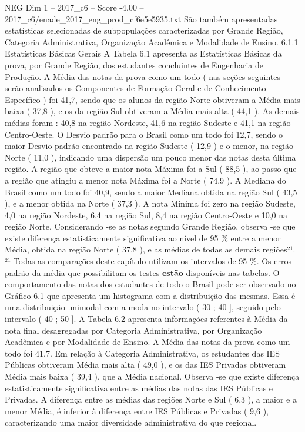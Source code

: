 \begin{textsample}{NEG Dim 1 – 2017\_c6 – Score -4.00 – 2017\_c6/enade\_2017\_eng\_prod\_cf6e5e5935.txt}
São também apresentadas estatísticas selecionadas de subpopulações caracterizadas por Grande Região, Categoria Administrativa, Organização Acadêmica e Modalidade de Ensino. 6.1.1 Estatísticas Básicas Gerais A Tabela 6.1 apresenta as Estatísticas Básicas da prova, por Grande Região, dos estudantes concluintes de Engenharia de Produção.
A Média das notas da prova como um todo ( nas seções seguintes serão analisados os Componentes de Formação Geral e de Conhecimento Específico ) foi 41,7, sendo que os alunos da região Norte obtiveram a Média mais baixa ( 37,8 ), e os da região Sul obtiveram a Média mais alta ( 44,1 ).
As demais médias foram : 40,8 na região Nordeste, 41,6 na região Sudeste e 41,1 na região Centro-Oeste.
O Desvio padrão para o Brasil como um todo foi 12,7, sendo o maior Desvio padrão encontrado na região Sudeste ( 12,9 ) e o menor, na região Norte ( 11,0 ), indicando uma dispersão um pouco menor das notas desta última região.
A região que obteve a maior nota Máxima foi a Sul ( 88,5 ), ao passo que a região que atingiu a menor nota Máxima foi a Norte ( 74,9 ).
A Mediana do Brasil como um todo foi 40,9, sendo a maior Mediana obtida na região Sul ( 43,5 ), e a menor obtida na Norte ( 37,3 ).
A nota Mínima foi zero na região Sudeste, 4,0 na região Nordeste, 6,4 na região Sul, 8,4 na região Centro-Oeste e 10,0 na região Norte.
Considerando -se as notas segundo Grande Região, observa -se que existe diferença estatisticamente significativa ao nível de 95 \% entre a menor Média, obtida na região Norte ( 37,8 ), e as médias de todas as demais regiões²¹. ²¹ Todas as comparações deste capítulo utilizam os intervalos de 95 \%.
Os erros-padrão da média que possibilitam os testes \textbf{estão} disponíveis nas tabelas.
O comportamento das notas dos estudantes de todo o Brasil pode ser observado no Gráfico 6.1 que apresenta um histograma com a distribuição das mesmas.
Essa é uma distribuição unimodal com a moda no intervalo ( 30 ; 40 ], seguido pelo intervalo ( 40 ; 50 ].
A Tabela 6.2 apresenta informações referentes à Média da nota final desagregadas por Categoria Administrativa, por Organização Acadêmica e por Modalidade de Ensino.
A Média das notas da prova como um todo foi 41,7.
Em relação à Categoria Administrativa, os estudantes das IES Públicas obtiveram Média mais alta ( 49,0 ), e os das IES Privadas obtiveram Média mais baixa ( 39,4 ), que a Média nacional.
Observa -se que existe diferença estatisticamente significativa entre as médias das notas das IES Públicas e Privadas.
A diferença entre as médias das regiões Norte e Sul ( 6,3 ), a maior e a menor Média, é inferior à diferença entre IES Públicas e Privadas ( 9,6 ), caracterizando uma maior diversidade administrativa do que regional.

\end{textsample}
